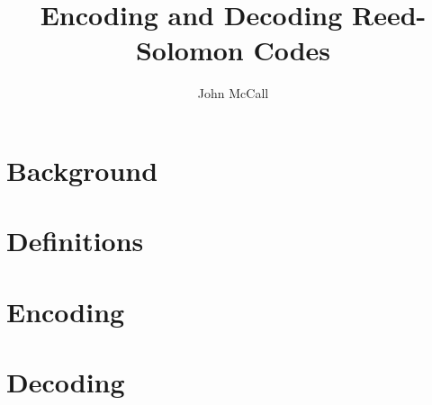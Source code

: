 \documentclass{article}
\title{Encoding and Decoding Reed-Solomon Codes}
\author{John McCall}
\begin{document}
\maketitle

\section{Background}


\section{Definitions}

\section{Encoding}

\section{Decoding}
\end{document}
